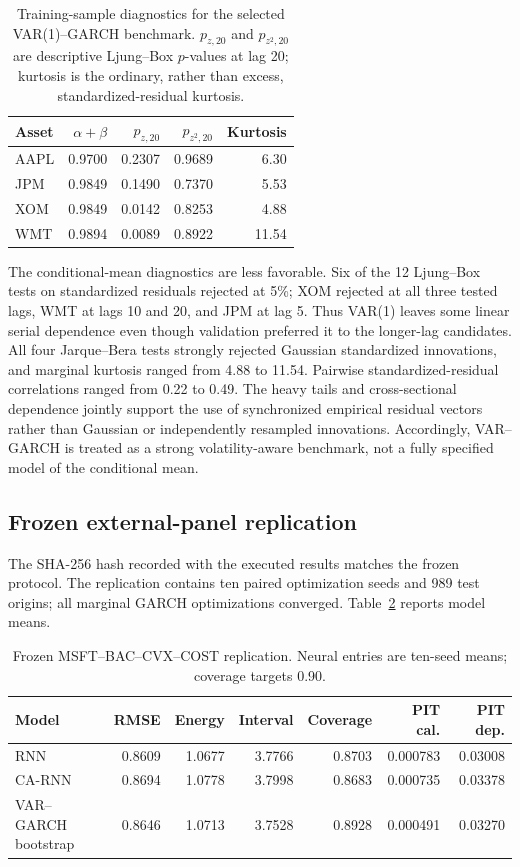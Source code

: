 \documentclass[11pt]{article}
\begin{document}
\begin{table}[ht]
\centering
\caption{Training-sample diagnostics for the selected VAR(1)--GARCH benchmark.
$p_{z,20}$ and $p_{z^2,20}$ are descriptive Ljung--Box $p$-values at lag 20;
kurtosis is the ordinary, rather than excess, standardized-residual kurtosis.}
\label{tab:var-garch-diagnostics}
\begin{tabular}{lrrrr}
\toprule
Asset & $\alpha+\beta$ & $p_{z,20}$ & $p_{z^2,20}$ & Kurtosis \\
\midrule
AAPL & 0.9700 & 0.2307 & 0.9689 & 6.30 \\
JPM  & 0.9849 & 0.1490 & 0.7370 & 5.53 \\
XOM  & 0.9849 & 0.0142 & 0.8253 & 4.88 \\
WMT  & 0.9894 & 0.0089 & 0.8922 & 11.54 \\
\bottomrule
\end{tabular}
\end{table}

The conditional-mean diagnostics are less favorable. Six of the 12 Ljung--Box
tests on standardized residuals rejected at 5\%; XOM rejected at all three
tested lags, WMT at lags 10 and 20, and JPM at lag 5. Thus VAR(1) leaves some
linear serial dependence even though validation preferred it to the longer-lag
candidates. All four Jarque--Bera tests strongly rejected Gaussian standardized
innovations, and marginal kurtosis ranged from 4.88 to 11.54. Pairwise
standardized-residual correlations ranged from 0.22 to 0.49. The heavy tails and
cross-sectional dependence jointly support the use of synchronized empirical
residual vectors rather than Gaussian or independently resampled innovations.
Accordingly, VAR--GARCH is treated as a strong volatility-aware benchmark, not a
fully specified model of the conditional mean.

\subsection{Frozen external-panel replication}

The SHA-256 hash recorded with the executed results matches the frozen protocol.
The replication contains ten paired optimization
seeds and 989 test origins; all marginal GARCH optimizations converged.
Table~\ref{tab:confirmatory-results} reports model means.

\begin{table}[ht]
\centering
\caption{Frozen MSFT--BAC--CVX--COST replication. Neural entries are ten-seed
means; coverage targets 0.90.}
\label{tab:confirmatory-results}
\begin{tabular}{lrrrrrr}
\toprule
Model & RMSE & Energy & Interval & Coverage & PIT cal. & PIT dep. \\
\midrule
RNN & 0.8609 & 1.0677 & 3.7766 & 0.8703 & 0.000783 & 0.03008 \\
CA-RNN & 0.8694 & 1.0778 & 3.7998 & 0.8683 & 0.000735 & 0.03378 \\
VAR--GARCH bootstrap & 0.8646 & 1.0713 & 3.7528 & 0.8928 & 0.000491 & 0.03270 \\
\bottomrule
\end{tabular}
\end{table}
\end{document}
